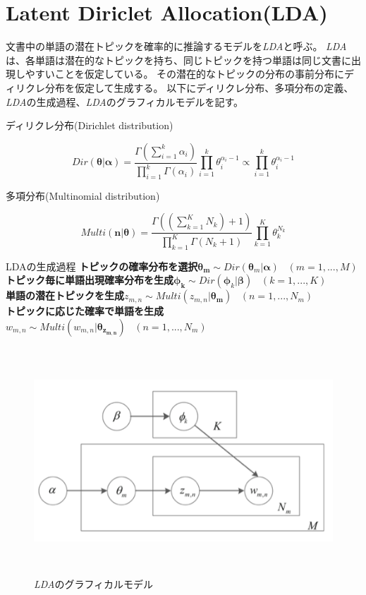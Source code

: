 \documentclass[titlepage,12pt]{jreport}
\begin{document}
\section{Latent Diriclet Allocation(LDA)\label{LDA}}
文書中の単語の潜在トピックを確率的に推論するモデルを{\it LDA}と呼ぶ\cite{lda03}。 {\it LDA}は、各単語は潜在的なトピックを持ち、同じトピックを持つ単語は同じ文書に出現しやすいことを仮定している。 その潜在的なトピックの分布の事前分布にディリクレ分布を仮定して生成する。 以下にディリクレ分布、多項分布の定義、{\it LDA}の生成過程、{\it LDA}のグラフィカルモデルを記す。
\begin{description}
\item [ディリクレ分布(Dirichlet distribution)]
\end{description}
\begin{equation}
Dir(\bm{\theta} | \bm{\alpha}) = \frac{\Gamma(\sum_{i=1}^{k}\alpha_{i})}{\prod_{i=1}^{k}\Gamma(\alpha_{i})}\prod_{i=1}^{k}\theta_{i}^{\alpha_{i}-1} \propto \prod_{i=1}^{k}\theta_{i}^{\alpha_{i}-1}
\end{equation}
\begin{description}
\item [多項分布(Multinomial distribution)]
\end{description}
\begin{equation}
Multi(\bm{n}|\bm{\theta}) = \frac{\Gamma((\sum_{k=1}^{K}N_{k}) + 1)}{\prod_{k=1}^{K}\Gamma(N_{k}+1)}\prod_{k=1}^{K}\theta_{k}^{N_{k}}
\end{equation}
\begin{itembox}[1]{LDAの生成過程}
\bf{トピックの確率分布を選択}$\bm{\theta_{m}} \sim Dir(\bm{\theta}_{m}|\bm{\alpha}) \;\;\;(m = 1,...,M)$\\
\bf{トピック毎に単語出現確率分布を生成}$\bm{\phi_{k}} \sim Dir(\bm{\phi}_{k}|\bm{\beta}) \;\;\;(k = 1,...,K)$\\
\bf{単語の潜在トピックを生成}$z_{m,n} \sim Multi(z_{m,n}|\bm{\theta_{m}}) \;\;\; (n = 1,...,N_{m})$\\
\bf{トピックに応じた確率で単語を生成}$w_{m,n} \sim Multi(w_{m,n}|\bm{\theta_{z_{m,n}}})\;\;\;(n = 1,...,N_{m})$
\end{itembox}
\begin{figure}[htbp]
\centering
\includegraphics[height = 85mm ,width = 130mm]{img/lda.png}
	\caption{{\it LDA}のグラフィカルモデル}
\label{fig:l1}
\end{figure}
\end{document}
